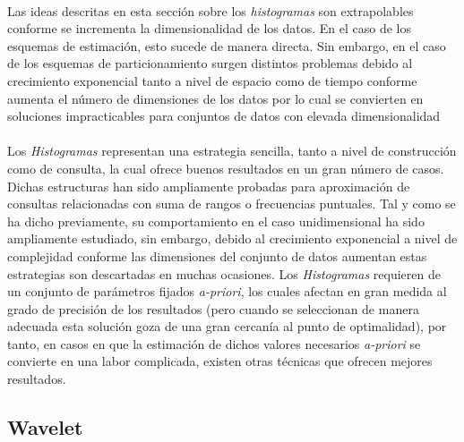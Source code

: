 \documentclass{subfiles}
\begin{document}
        \paragraph{}
        Las ideas descritas en esta sección sobre los \emph{histogramas} son extrapolables conforme se incrementa la dimensionalidad de los datos. En el caso de los esquemas de estimación, esto sucede de manera directa. Sin embargo, en el caso de los esquemas de particionamiento surgen distintos problemas debido al crecimiento exponencial tanto a nivel de espacio como de tiempo conforme aumenta el número de dimensiones de los datos por lo cual se convierten en soluciones impracticables para conjuntos de datos con elevada dimensionalidad

        \paragraph{}
        Los \emph{Histogramas} representan una estrategia sencilla, tanto a nivel de construcción como de consulta, la cual ofrece buenos resultados en un gran número de casos. Dichas estructuras han sido ampliamente probadas para aproximación de consultas relacionadas con suma de rangos o frecuencias puntuales. Tal y como se ha dicho previamente, su comportamiento en el caso unidimensional ha sido ampliamente estudiado, sin embargo, debido al crecimiento exponencial a nivel de complejidad conforme las dimensiones del conjunto de datos aumentan estas estrategias son descartadas en muchas ocasiones. Los \emph{Histogramas} requieren de un conjunto de parámetros fijados \emph{a-priori}, los cuales afectan en gran medida al grado de precisión de los resultados (pero cuando se seleccionan de manera adecuada esta solución goza de una gran cercanía al punto de optimalidad), por tanto, en casos en que la estimación de dichos valores necesarios \emph{a-priori} se convierte en una labor complicada, existen otras técnicas que ofrecen mejores resultados.

      \subsection{Wavelet}
      \label{sec:wavelet}
\end{document}
